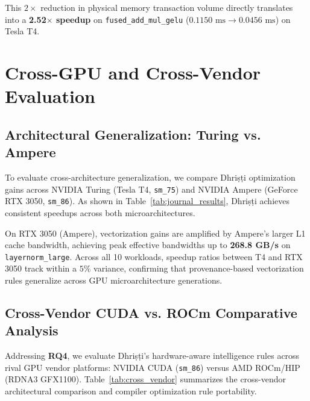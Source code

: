 \documentclass[10pt,journal,compsoc]{IEEEtran}
\begin{document}
This $2\times$ reduction in physical memory transaction volume directly translates into a \textbf{2.52$\times$ speedup} on \texttt{fused\_add\_mul\_gelu} ($0.1150\text{ ms} \rightarrow 0.0456\text{ ms}$) on Tesla T4.

\section{Cross-GPU and Cross-Vendor Evaluation}\label{sec:cross_gpu}

\subsection{Architectural Generalization: Turing vs. Ampere}
To evaluate cross-architecture generalization, we compare Dhri\d{s}\d{t}i optimization gains across NVIDIA Turing (Tesla T4, \texttt{sm\_75}) and NVIDIA Ampere (GeForce RTX 3050, \texttt{sm\_86}). As shown in Table~\ref{tab:journal_results}, Dhri\d{s}\d{t}i achieves consistent speedups across both microarchitectures.

On RTX 3050 (Ampere), vectorization gains are amplified by Ampere's larger L1 cache bandwidth, achieving peak effective bandwidths up to \textbf{268.8 GB/s} on \texttt{layernorm\_large}. Across all 10 workloads, speedup ratios between T4 and RTX 3050 track within a $5\%$ variance, confirming that provenance-based vectorization rules generalize across GPU microarchitecture generations.

\subsection{Cross-Vendor CUDA vs. ROCm Comparative Analysis}
Addressing \textbf{RQ4}, we evaluate Dhri\d{s}\d{t}i's hardware-aware intelligence rules across rival GPU vendor platforms: NVIDIA CUDA (\texttt{sm\_86}) versus AMD ROCm/HIP (RDNA3 GFX1100). Table~\ref{tab:cross_vendor} summarizes the cross-vendor architectural comparison and compiler optimization rule portability.
\end{document}
